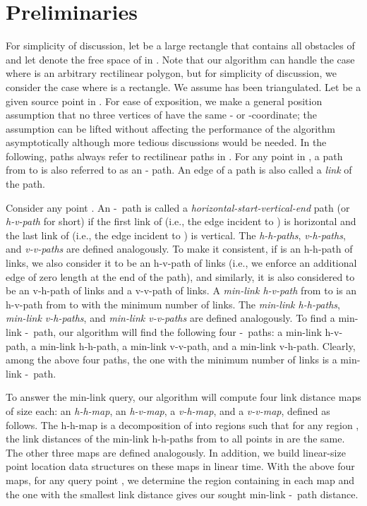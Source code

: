 \documentclass[english,runningheads,11pt]{llncs-revised}
\def\st{-}
\begin{document}
\section{Preliminaries}
\label{sec:pre}

For simplicity of discussion,
let  be a large rectangle that contains all obstacles of
 and let  denote the free space of  in . Note that our algorithm can handle the case where  is an arbitrary rectilinear polygon, but for simplicity of discussion, we consider the case where  is a rectangle.
We assume  has been triangulated. Let  be a given source
point in .  For ease of exposition, we make a general position
assumption that no three vertices of  have
the same - or -coordinate; the assumption can be lifted without
affecting the performance of the algorithm asymptotically although
more tedious discussions would be needed.
In the following, paths always refer to
rectilinear paths in . For any point  in
, a path from  to  is also referred to as an -
path. An edge of a path is also called a {\em link} of the path.

Consider any point .
An \st\ path  is called a {\em horizontal-start-vertical-end}
path (or {\em h-v-path} for short)
if the first link of  (i.e., the edge incident to ) is
horizontal and the last link of  (i.e., the edge incident to ) is
vertical. The {\em h-h-paths}, {\em v-h-paths}, and {\em v-v-paths} are
defined analogously.
To make it consistent, if  is an h-h-path of  links,
we also consider it to be an h-v-path of  links (i.e., we
enforce an additional edge of zero length at the end of the path), and
similarly, it is also considered to be an v-h-path of  links and
a v-v-path of  links. A {\em min-link h-v-path} from  to  is an h-v-path from  to  with
the minimum number of links. The {\em min-link h-h-paths}, {\em min-link v-h-paths}, and {\em min-link v-v-paths} are
defined analogously.
To find a min-link \st\ path, our algorithm will
find the following four \st\ paths: a min-link h-v-path,   a min-link
h-h-path,  a min-link v-v-path, and a min-link v-h-path. Clearly,
among the above four paths, the one with the minimum number of links
is a min-link \st\ path.



To answer the min-link query, our algorithm will compute four link
distance maps of  size each: an {\em  h-h-map}, an {\em h-v-map}, a {\em v-h-map},
and a {\em v-v-map}, defined as follows. The h-h-map is a
decomposition of  into regions such that for any region ,
the link distances of the min-link h-h-paths from  to all points in
 are the same. The other three maps are defined analogously.
In addition, we build linear-size point location data structures
\cite{ref:EdelsbrunnerOp86,ref:KirkpatrickOp83} on these maps in linear
time.  With the above four maps, for any query point , we determine the region
containing  in each map and the one
with the smallest link distance gives our sought min-link \st\ path
distance.
\end{document}
